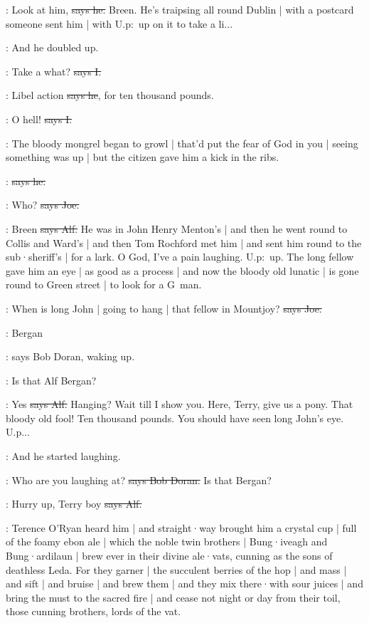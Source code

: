 \bergan:
Look at him,
\sout{says he.}
Breen.
He's traipsing all round Dublin |
with a postcard someone sent him |
with U.p:~up
on it to take a li...

\Nq:
And he doubled up.

:
Take a what?
\sout{says I.}

\bergan:
Libel action
\sout{says he},
for ten thousand pounds.

:
O hell!
\sout{says I.}

\Nq:
The bloody mongrel began to growl |
that'd put the fear of God in you |
seeing something was up |
but the citizen gave him a kick in the ribs.

\citizen:
\sout{says he.}

\joe:
Who?
\sout{says Joe.}

\bergan:
Breen
\sout{says Alf.}
He was in John Henry Menton's |
and then he went round to Collis and Ward's |
and then Tom Rochford met him |
and sent him round to the sub·sheriff's |
for a lark.
O God,
I've a pain laughing.
U.p:~up.
The long fellow gave him an eye |
as good as a process
 |
and now the bloody old lunatic |
is gone round to Green street |
to look for a G~man.

\joe:
When is long John |
going to hang |
that fellow in Mountjoy?
\sout{says Joe.}

\doran:
Bergan

\Nq:
says Bob Doran,
waking up.

\doran:
Is that Alf Bergan?

\bergan:
Yes
\sout{says Alf.}
Hanging?
Wait till I show you.
Here,
Terry,
give us a pony.
That bloody old fool!
Ten thousand pounds.
You should have seen long John's eye.
U.p...

\Nq:
And he started laughing.

\doran:
Who are you laughing at?
\sout{says Bob Doran.}
Is that Bergan?

\bergan:
Hurry up,
Terry boy
\sout{says Alf.}

:
Terence O'Ryan heard him
 |
and straight·way brought him a crystal cup |
full of the foamy ebon ale |
which the noble twin brothers |
Bung·iveagh and Bung·ardilaun |
brew ever in their divine ale·vats,
cunning as the sons of deathless Leda.
For they garner |
the succulent berries of the hop |
and mass |
and sift |
and bruise |
and brew them |
and they mix there·with sour juices |
and bring the must to the sacred fire |
and cease not night or day from their toil,
those cunning brothers,
lords of the vat.

